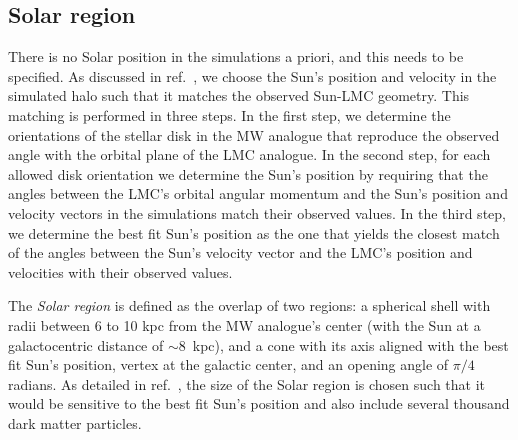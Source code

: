 \documentclass[12pt]{article}
\begin{document}
\subsection{Solar region}

There is no Solar position in the simulations a priori, and this needs to be specified. As discussed in  ref.~\cite{Smith-Orlik:2023kyl}, we choose the Sun's position and velocity in the simulated halo such that it matches the observed Sun-LMC geometry. This matching is performed in three steps. In the first step, we determine the orientations of the stellar disk in the MW analogue that reproduce the observed angle with the orbital plane of the LMC analogue. In the second step, for each allowed disk orientation we determine the Sun's position by requiring that the  angles between the LMC's orbital angular momentum and the Sun's position and velocity vectors in the simulations match their observed values. In the third step, we determine the best fit Sun's position as the one that yields the closest match of the angles between the Sun's velocity vector and the LMC's position and velocities with their observed values.

The \emph{Solar region} is defined as the overlap of two regions: a spherical shell with radii between 6 to 10 kpc from the MW analogue's center (with the Sun at a galactocentric distance of $\sim 8$~kpc), and a cone with its axis aligned with the best fit Sun's position, vertex at the galactic center, and an opening angle of $\pi/4$ radians. As detailed in ref.~\cite{Smith-Orlik:2023kyl}, the size of the Solar region is chosen such that it would be sensitive to the best fit Sun's position and also include several thousand dark matter particles. %
\end{document}
